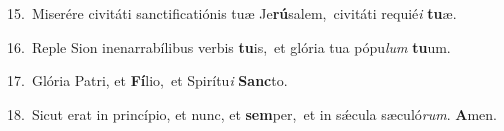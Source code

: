{\numbfont\textcolor{\numbcolor}{15.}}~Miserére civitáti sanctificatiónis tuæ Je\-\textbf{rú}\-salem,~\star civitáti requié\textit{i} \textbf{tu}\-æ.\par
{\numbfont\textcolor{\numbcolor}{16.}}~Reple Sion inenarrabílibus verbis \textbf{tu}\-is,~\star et glória tua pópu\textit{lum} \textbf{tu}\-um.\par
{\numbfont\textcolor{\numbcolor}{17.}}~Glória Patri, et \textbf{Fí}\-lio,~\star et Spirítu\textit{i} \textbf{Sanc}\-to.\par
{\numbfont\textcolor{\numbcolor}{18.}}~Sicut erat in princípio, et nunc, et \textbf{sem}\-per,~\star et in sǽcula sæculó\-\textit{rum}\-. \textbf{A}\-men.\par

